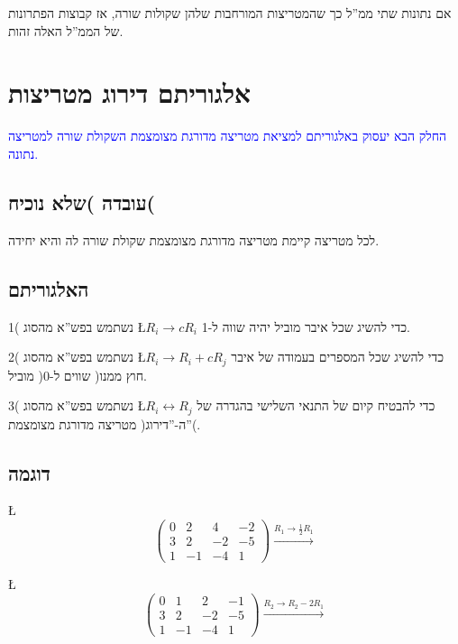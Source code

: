 \documentclass[english,hebrew]{article}
\begin{document}
אם נתונות שתי ממ\textquotedblright ל כך שהמטריצות המורחבות שלהן שקולות
שורה, אז קבוצות הפתרונות של הממ\textquotedblright ל האלה זהות.

\medskip{}

\section{אלגוריתם דירוג מטריצות}

\textcolor{blue}{החלק הבא יעסוק באלגוריתם למציאת מטריצה מדורגת מצומצמת
השקולת שורה למטריצה נתונה.}

\subsection{עובדה )שלא נוכיח(}

לכל מטריצה קיימת מטריצה מדורגת מצומצמת שקולת שורה לה והיא יחידה.

\subsection{האלגוריתם}

1( נשתמש בפש\textquotedblright א מהסוג \L{$R_{i}\to cR_{i}$} כדי
להשיג שכל איבר מוביל יהיה שווה ל-1.

2( נשתמש בפש\textquotedblright א מהסוג \L{$R_{i}\to R_{i}+cR_{j}$}
כדי להשיג שכל המספרים בעמודה של איבר מוביל )חוץ ממנו( שווים ל-0.

3( נשתמש בפש\textquotedblright א מהסוג \L{$R_{i}\leftrightarrow R_{j}$}
כדי להבטיח קיום של התנאי השלישי בהגדרה של מטריצה מדורגת מצומצמת )ה-\textquotedblright דירוג\textquotedblright (.

\subsection{דוגמה}

\L{%
\[
\left(\begin{array}{cccc}
0 & 2 & 4 & -2\\
3 & 2 & -2 & -5\\
1 & -1 & -4 & 1
\end{array}\right)\xrightarrow{R_{1}\to\frac{1}{2}R_{1}}
\]
}%

\L{%
\[
\left(\begin{array}{cccc}
0 & 1 & 2 & -1\\
3 & 2 & -2 & -5\\
1 & -1 & -4 & 1
\end{array}\right)\xrightarrow{R_{2}\to R_{2}-2R_{1}}
\]
}%
\end{document}
